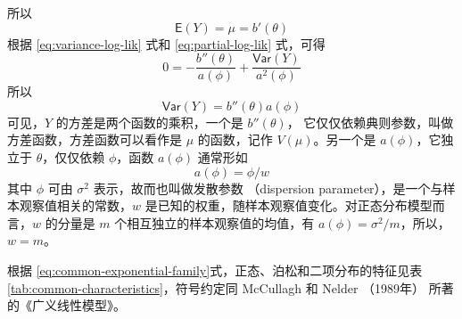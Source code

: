 \documentclass[12pt,a4paper,UTF8,twoside]{book}
\theoremstyle{definition}
\theoremstyle{definition}
\theoremstyle{definition}
\theoremstyle{remark}
\begin{document}
\noindent 所以
\[ \mathsf{E}(Y) = \mu = b'(\theta) \]
\noindent 根据 \eqref{eq:variance-log-lik} 式和 \eqref{eq:partial-log-lik} 式，可得
\[ 0 = - \frac{b''(\theta)}{a(\phi)} + \frac{\mathsf{Var}(Y)}{a^2(\phi)} \]
\noindent 所以
\[ \mathsf{Var}(Y) = b''(\theta)a(\phi) \]
可见，\(Y\) 的方差是两个函数的乘积，一个是 \(b''(\theta)\)， 它仅仅依赖典则参数，叫做方差函数，方差函数可以看作是 \(\mu\) 的函数，记作 \(V(\mu)\)。另一个是 \(a(\phi)\)，它独立于 \(\theta\)，仅仅依赖 \(\phi\)，函数 \(a(\phi)\) 通常形如
\[ a(\phi) = \phi/w \]
\noindent 其中 \(\phi\) 可由 \(\sigma^2\) 表示，故而也叫做发散参数 （dispersion parameter），是一个与样本观察值相关的常数，\(w\) 是已知的权重，随样本观察值变化。对正态分布模型而言，\(w\) 的分量是 \(m\) 个相互独立的样本观察值的均值，有 \(a(\phi) = \sigma^2/m\)，所以，\(w = m\)。

根据 \eqref{eq:common-exponential-family}式，正态、泊松和二项分布的特征见表 \ref{tab:common-characteristics}，符号约定同 McCullagh 和 Nelder （1989年） 所著的《广义线性模型》。
\end{document}
